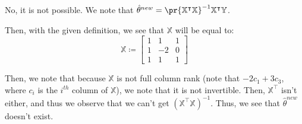 \documentclass{article}
\begin{document}
\begin{solution}
	No, it is not possible. We note that $\hat\theta^{new} = \pr{\mathbb X^{\intercal} \mathbb X}^{-1} \mathbb X^{\intercal} \mathbb Y$.
	
	Then, with the given definition, we see that $\mathbb X$ will be equal to:
	\begin{equation*}
		\mathbb X \coloneq \begin{bmatrix}
			1 & 1 & 1 \\ 1 & -2 & 0 \\ 1 & 1 & 1
		\end{bmatrix}
	\end{equation*}

	Then, we note that because $\mathbb X$ is not full column rank (note that $-2c_{1} + 3c_{3}$, where $c_{i}$ is the $i^{th}$ column of $\mathbb X$), we note that it is not invertible. Then, $\mathbb X^{\intercal}$ isn't either, and thus we observe that we can't get $(\mathbb X^{\intercal} \mathbb X)^{-1}$. Thus, we see that $\hat\theta^{new}$ doesn't exist.
	\begin{comment}
		Yes, it's possible to find a unique optimal solution in this case still. To do this, we proceed as follows:
		
		First, we see that $\mathbb X$ will be equal to:
		\begin{equation*}
			\mathbb X \coloneq \begin{bmatrix}
				1 & 1 & 1 \\ 1 & -2 & 0 \\ 1 & 1 & 1
			\end{bmatrix}
		\end{equation*}
		
		Then, we have
		\begin{equation*}
			\mathbb X^{\intercal} \coloneq \begin{bmatrix}
				1 & 1 & 1 \\ 1 & -2 & 1 \\ 1 & 0 & 1
			\end{bmatrix}
		\end{equation*}
		
		And we have
		\begin{equation*}
			\mathbb Y \coloneq \begin{bmatrix}
				-1 \\ 3 \\ 4
			\end{bmatrix}
		\end{equation*}
		

\end{comment}
\end{solution}
\end{document}
